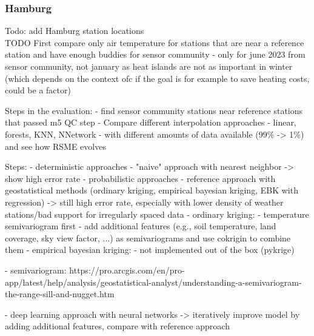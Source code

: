 \subsubsection{Hamburg}

Todo: add Hamburg station locations\\

TODO
First compare only air temperature for stations that are near a reference station and have enough buddies for sensor community
- only for june 2023 from sensor community, not january as heat islands are not as important in winter (which depends on the context ofc if the goal is for example to save heating costs, could be a factor)

Steps in the evaluation:
- find sensor community stations near reference stations that passed m5 QC step
- Compare different interpolation approaches
  - linear, forests, KNN, NNetwork
  - with different amounts of data available (99\% -> 1\%) and see how RSME evolves


Steps:
- deterministic approaches
  - "naive" approach with nearest neighbor -> show high error rate
- probabilistic approaches
  - reference approach with geostatistical methods (ordinary kriging, empirical bayesian kriging, EBK with regression) -> still high error rate, especially with lower density of weather stations/bad support for irregularly spaced data
    - ordinary kriging:
        - temperature semivariogram first
        - add additional features (e.g., soil temperature, land coverage, sky view factor, ...) as semivariograms and use cokrigin to combine them
    - empirical bayesian kriging:
        - not implemented out of the box (pykrige)

  - semivariogram: https://pro.arcgis.com/en/pro-app/latest/help/analysis/geostatistical-analyst/understanding-a-semivariogram-the-range-sill-and-nugget.htm

- deep learning approach with neural networks -> iteratively improve model by adding additional features, compare with reference approach


